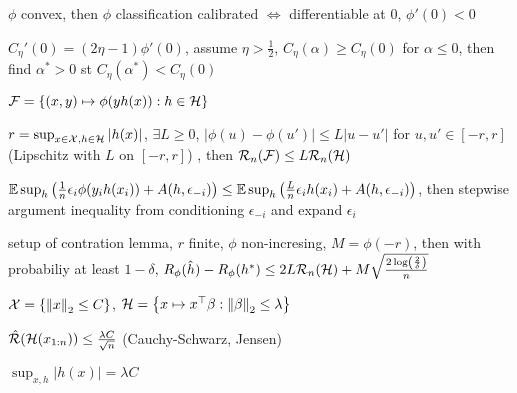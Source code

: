 \begin{thm}
    $\phi$ convex, then $\phi$ classification calibrated $\iff$ differentiable at $0$, $\phi'(0) < 0$
\end{thm}
\begin{pf}
    $C_\eta'(0) = (2\eta - 1)\phi'(0)$, assume $\eta > \frac{1}{2}$, $C_\eta(\alpha) \geq C_{\eta}(0)$ for $\alpha \leq 0$, then find $\alpha^* > 0$ st $C_\eta(\alpha^*) < C_\eta(0)$
\end{pf}

\begin{setting}
    $\mathcal{F} = \left\{ (x, y) \mapsto \phi(yh(x)) : h \in \mathcal{H} \right\}$
\end{setting}

\begin{lemma}
    $r = \sup_{x \in \mathcal{X}, h \in \mathcal{H}}|h(x)|$, $\exists L \geq 0$, $|\phi(u) - \phi(u')| \leq L |u - u'|$ for $u, u' \in [-r, r]$ (Lipschitz with $L$ on $[-r, r]$)
    , then $\mathcal{R}_n(\mathcal{F}) \leq L \mathcal{R}_n(\mathcal{H})$
\end{lemma}
\begin{pf}
    $\mathbb{E} \sup_h \left( \frac{1}{n} \epsilon_i \phi(y_i h(x_i)) + A(h, \epsilon_{-i}) \right) \leq \mathbb{E} \sup_h \left( \frac{L}{n} \epsilon_i h(x_i) + A(h, \epsilon_{-i}) \right)$, then stepwise argument
    inequality from conditioning $\epsilon_{-i}$ and expand $\epsilon_i$
\end{pf}

\begin{cor}
    setup of contration lemma, $r$ finite, $\phi$ non-incresing, $M = \phi(-r)$, then with probabiliy at least $1 - \delta$,
    $R_\phi(\hat h) - R_\phi (h^*) \leq 2L \mathcal{R}_n(\mathcal{H}) + M \sqrt{\frac{2 \log(\frac{2}{\delta})}{n}}$
\end{cor}

\begin{example}[$l_2$-constraint]
    \begin{setting}
        $\mathcal{X} = \left\{ \left\lVert x\right\rVert_2 \leq C \right\}$, $\mathcal{H} = \left\{ x \mapsto x^{\top}\beta : \left\lVert\beta\right\rVert_2 \leq \lambda\right\}$
    \end{setting}
    \begin{fact}
        $\hat {\mathcal{R}}(\mathcal{H}(x_{1:n})) \leq \frac{\lambda C}{\sqrt{n}}$ (Cauchy-Schwarz, Jensen)
    \end{fact}
    \begin{fact}
        $\sup_{x, h} |h(x)| = \lambda C$
    \end{fact}
\end{example}

